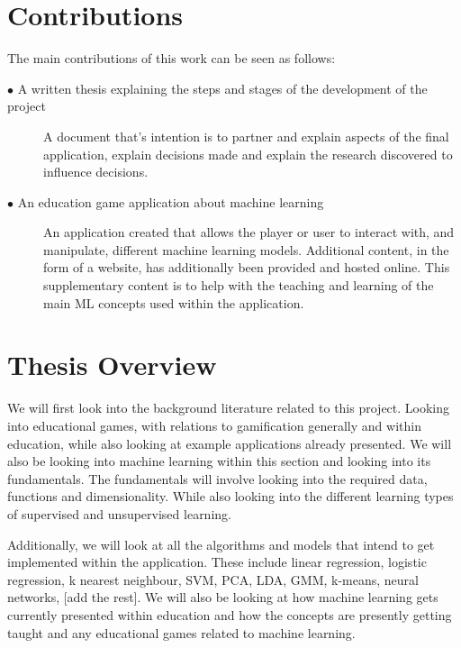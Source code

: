 	
	\section{Contributions} 
		\label{sec:intro_contribs} 
		
		The main contributions of this work can be seen as follows:
		
		\begin{description}	
		
			\item[$\bullet$ A written thesis explaining the steps and stages of the development of the project]\hfill
			
			A document that's intention is to partner and explain aspects of the final application, explain decisions made and explain the research discovered to influence decisions.  
			
			\item[$\bullet$ An education game application about machine learning]\hfill
			
			An application created that allows the player or user to interact with, and manipulate, different machine learning models. Additional content, in the form of a website, has additionally been provided and hosted online. This supplementary content is to help with the teaching and learning of the main ML concepts used within the application.
			
			
		\end{description}
	
	\section{Thesis Overview}  
		\label{sec:intro_thesis_overview} 
		We will first look into the background literature related to this project. Looking into educational games, with relations to gamification generally and within education, while also looking at example applications already presented. We will also be looking into machine learning within this section and looking into its fundamentals. The fundamentals will involve looking into the required data, functions and dimensionality. While also looking into the different learning types of supervised and unsupervised learning.
		
		Additionally, we will look at all the algorithms and models that intend to get implemented within the application. These include linear regression, logistic regression, k nearest neighbour, SVM, PCA, LDA, GMM, k-means, neural networks, [add the rest]. We will also be looking at how machine learning gets currently presented within education and how the concepts are presently getting taught and any educational games related to machine learning.
		
